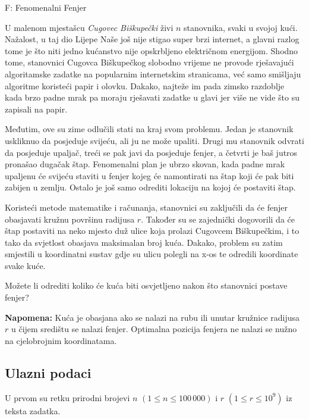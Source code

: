 \begin{statement}[
  timelimit=1 s,
  memorylimit=512 MiB,
]{F: Fenomenalni Fenjer}

U malenom mjestašcu \textit{Cugovec Biškupečki} živi $n$ stanovnika, svaki u
svojoj kući. Nažalost, u taj dio Lijepe Naše još nije stigao super brzi
internet, a glavni razlog tome je što niti jedno kućanstvo nije opskrbljeno
električnom energijom. Shodno tome, stanovnici Cugovca Biškupečkog slobodno
vrijeme ne provode rješavajući algoritamske zadatke na popularnim
internetskim stranicama, već samo smišljaju algoritme koristeći papir i
olovku. Dakako, najteže im pada zimsko razdoblje kada brzo padne mrak pa
moraju rješavati zadatke u glavi jer više ne vide što su zapisali na papir.

Međutim, ove su zime odlučili stati na kraj svom problemu. Jedan je stanovnik
uskliknuo da posjeduje svijeću, ali ju ne može upaliti. Drugi mu stanovnik
odvrati da posjeduje upaljač, treći se pak javi da posjeduje fenjer, a
četvrti je baš jutros pronašao dugačak štap. Fenomenalni plan je ubrzo
skovan, kada padne mrak upaljenu će svijeću staviti u fenjer kojeg će
namontirati na štap koji će pak biti zabijen u zemlju. Ostalo je još samo
odrediti lokaciju na kojoj će postaviti štap.

Koristeći metode matematike i računanja, stanovnici su zaključili da će fenjer
obasjavati kružnu površinu radijusa $r$. Također su se zajednički dogovorili
da će štap postaviti na neko mjesto duž ulice koja prolazi Cugovcem
Biškupečkim, i to tako da svjetlost obasjava maksimalan broj kuća. Dakako,
problem su zatim smjestili u koordinatni sustav gdje su ulicu polegli na x-os
te odredili koordinate svake kuće.

Možete li odrediti koliko će kuća biti osvjetljeno nakon što stanovnici postave
fenjer?

\textbf{Napomena:} Kuća je obasjana ako se nalazi na rubu ili unutar kružnice
radijusa $r$ u čijem središtu se nalazi fenjer. Optimalna pozicija fenjera ne
nalazi se nužno na cjelobrojnim koordinatama.

\subsection*{Ulazni podaci}
U prvom su retku prirodni brojevi $n$ $(1 \le n \le 100\,000)$ i $r$
$(1 \le r \le 10^9)$ iz teksta zadatka.


\end{statement}
